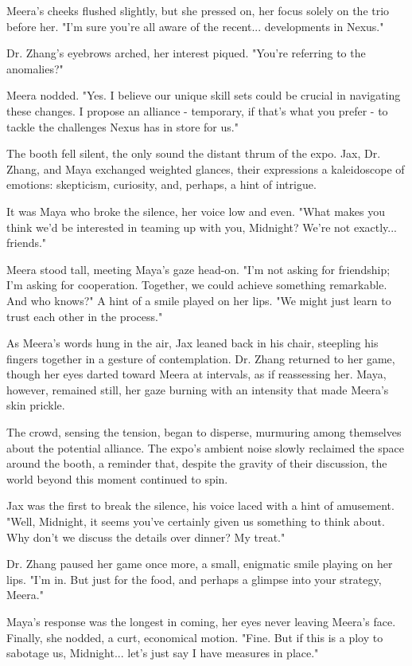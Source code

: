 \documentclass[12pt]{book}
\begin{document}
Meera's cheeks flushed slightly, but she pressed on, her focus solely on
the trio before her. "I'm sure you're all aware of the recent...
developments in Nexus."

Dr. Zhang's eyebrows arched, her interest piqued. "You're referring to
the anomalies?"

Meera nodded. "Yes. I believe our unique skill sets could be crucial in
navigating these changes. I propose an alliance - temporary, if that's
what you prefer - to tackle the challenges Nexus has in store for us."

The booth fell silent, the only sound the distant thrum of the expo.
Jax, Dr. Zhang, and Maya exchanged weighted glances, their expressions a
kaleidoscope of emotions: skepticism, curiosity, and, perhaps, a hint of
intrigue.

It was Maya who broke the silence, her voice low and even. "What makes
you think we'd be interested in teaming up with you, Midnight? We're not
exactly... friends."

Meera stood tall, meeting Maya's gaze head-on. "I'm not asking for
friendship; I'm asking for cooperation. Together, we could achieve
something remarkable. And who knows?" A hint of a smile played on her
lips. "We might just learn to trust each other in the process."

As Meera's words hung in the air, Jax leaned back in his chair,
steepling his fingers together in a gesture of contemplation. Dr. Zhang
returned to her game, though her eyes darted toward Meera at intervals,
as if reassessing her. Maya, however, remained still, her gaze burning
with an intensity that made Meera's skin prickle.

The crowd, sensing the tension, began to disperse, murmuring among
themselves about the potential alliance. The expo's ambient noise slowly
reclaimed the space around the booth, a reminder that, despite the
gravity of their discussion, the world beyond this moment continued to
spin.

Jax was the first to break the silence, his voice laced with a hint of
amusement. "Well, Midnight, it seems you've certainly given us something
to think about. Why don't we discuss the details over dinner? My treat."

Dr. Zhang paused her game once more, a small, enigmatic smile playing on
her lips. "I'm in. But just for the food, and perhaps a glimpse into
your strategy, Meera."

Maya's response was the longest in coming, her eyes never leaving
Meera's face. Finally, she nodded, a curt, economical motion. "Fine. But
if this is a ploy to sabotage us, Midnight... let's just say I have
measures in place."
\end{document}
